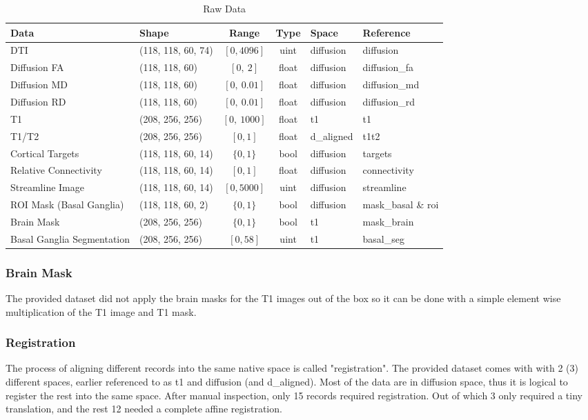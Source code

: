 \begin{table}[H]
\centering
\begin{tabular}{|l|l|c|c|l|l|}
\hline
\textbf{Data} & \textbf{Shape} & \textbf{Range} & \textbf{Type} & \textbf{Space} & \textbf{Reference} \\ \hline
\ac{DTI} & (118, 118, 60, 74) & $[0,4096]$ & uint & diffusion & diffusion \\ \hline
Diffusion \ac{FA} & (118, 118, 60) & $[0,~2]$ & float & diffusion & diffusion\_fa \\ \hline
Diffusion \ac{MD} & (118, 118, 60) & $[0,~0.01]$ & float & diffusion & diffusion\_md \\ \hline
Diffusion \ac{RD} & (118, 118, 60) & $[0,~0.01]$ & float & diffusion & diffusion\_rd \\ \hline
T1 & (208, 256, 256) & $[0,~1000]$ & float & t1 & t1 \\ \hline
T1/T2 & (208, 256, 256) & $[0,1]$ & float & d\_aligned & t1t2 \\ \hline
Cortical Targets & (118, 118, 60, 14) & $\{0,1\}$ & bool & diffusion & targets \\ \hline
Relative Connectivity & (118, 118, 60, 14) & $[0,1]$ & float & diffusion & connectivity \\ \hline
Streamline Image & (118, 118, 60, 14) & $[0,5000]$ & uint & diffusion & streamline \\ \hline
\ac{ROI} Mask (Basal Ganglia) & (118, 118, 60, 2) & $\{0,1\}$ & bool & diffusion & mask\_basal \& roi \\ \hline
Brain Mask & (208, 256, 256) & $\{0,1\}$ & bool & t1 & mask\_brain \\ \hline
Basal Ganglia Segmentation & (208, 256, 256) & $[0, 58]$ & uint & t1 & basal\_seg \\ \hline
\end{tabular}
\caption{Raw Data}
\label{tab:datas1}
\end{table}

\subsubsection{Brain Mask}
The provided dataset did not apply the brain masks for the T1 images out of the box so it can be done with a simple element wise multiplication of the T1 image and T1 mask.

\subsubsection{Registration}
The process of aligning different records into the same native space is called "registration". The provided dataset comes with with 2 (3) different spaces, earlier referenced to as t1 and diffusion (and d\_aligned). Most of the data are in diffusion space, thus it is logical to register the rest into the same space. After manual inspection, only 15 records required registration. Out of which 3 only required a tiny translation, and the rest 12 needed a complete affine registration.\par

